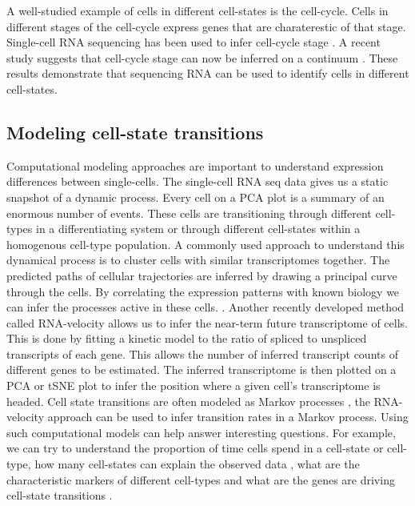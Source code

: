 A well-studied example of cells in different cell-states is the cell-cycle. Cells in different stages of the cell-cycle express genes that are charaterestic of that stage. Single-cell RNA sequencing has been used to infer cell-cycle stage \cite{buettner_computational_2015,leng_oscope_2015}. A recent study suggests that cell-cycle stage can now be inferred on a continuum  \cite{hsiao_characterizing_2019}. These results demonstrate that sequencing RNA can be used to identify cells in different cell-states.  \cite{trapnell_defining_2015,shaffer_memory_2018,sharma_chromatin-mediated_2010}

\subsection{Modeling cell-state transitions}

Computational modeling approaches are important to understand expression differences between single-cells. The single-cell RNA seq data gives us a static snapshot of a dynamic process. Every cell on a PCA plot is a summary of an enormous number of events. These cells are transitioning through different cell-types in a differentiating system or through different cell-states within a homogenous cell-type population. A commonly used approach to understand this dynamical process is to cluster cells with similar transcriptomes together. The predicted paths of cellular trajectories are inferred by drawing a principal curve through the cells. By correlating the expression patterns with known biology we can infer the processes active in these cells. \cite{trapnell_dynamics_2014}. Another recently developed method called RNA-velocity allows us to infer the near-term future transcriptome of cells. This is done by fitting a kinetic model to the ratio of spliced to unspliced transcripts of each gene. This allows the number of inferred transcript counts of different genes to be estimated. The inferred transcriptome is then plotted on a PCA or tSNE plot to infer the position where a given cell's transcriptome is headed.  \cite{manno_rna_2018} Cell state transitions are often modeled as Markov processes \cite{stumpf_stem_2017}, the RNA-velocity approach can be used to infer transition rates in a Markov process. Using such computational models can help answer interesting questions. For example, we can try to understand the proportion of time cells spend in a cell-state or cell-type, how many cell-states can explain the observed data  \cite{chang_transcriptome-wide_2008}, what are the characteristic markers of different cell-types and what are the genes are driving cell-state transitions \cite{furchtgott_discovering_2017}.
